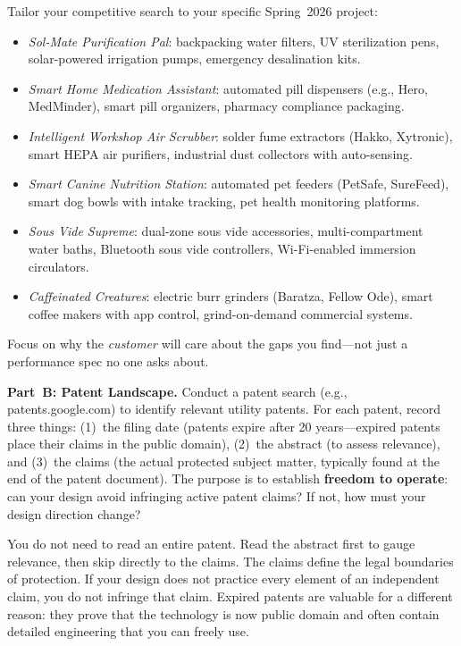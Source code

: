 \documentclass[11pt,letterpaper,twoside,openany]{book}
\begin{document}
\begin{tipbox}
Tailor your competitive search to your specific Spring~2026 project:
\begin{itemize}[nosep]
\item \textit{Sol-Mate Purification Pal}: backpacking water filters, UV sterilization pens, solar-powered irrigation pumps, emergency desalination kits.
\item \textit{Smart Home Medication Assistant}: automated pill dispensers (e.g., Hero, MedMinder), smart pill organizers, pharmacy compliance packaging.
\item \textit{Intelligent Workshop Air Scrubber}: solder fume extractors (Hakko, Xytronic), smart HEPA air purifiers, industrial dust collectors with auto-sensing.
\item \textit{Smart Canine Nutrition Station}: automated pet feeders (PetSafe, SureFeed), smart dog bowls with intake tracking, pet health monitoring platforms.
\item \textit{Sous Vide Supreme}: dual-zone sous vide accessories, multi-compartment water baths, Bluetooth sous vide controllers, Wi-Fi-enabled immersion circulators.
\item \textit{Caffeinated Creatures}: electric burr grinders (Baratza, Fellow Ode), smart coffee makers with app control, grind-on-demand commercial systems.
\end{itemize}
Focus on why the \emph{customer} will care about the gaps you find---not just a performance spec no one asks about.
\end{tipbox}

\textbf{Part~B: Patent Landscape.} Conduct a patent search (e.g., patents.google.com) to identify relevant utility patents. For each patent, record three things: (1)~the filing date (patents expire after 20 years---expired patents place their claims in the public domain), (2)~the abstract (to assess relevance), and (3)~the claims (the actual protected subject matter, typically found at the end of the patent document). The purpose is to establish \textbf{freedom to operate}: can your design avoid infringing active patent claims? If not, how must your design direction change?

\begin{tipbox}
You do not need to read an entire patent. Read the abstract first to gauge relevance, then skip directly to the claims. The claims define the legal boundaries of protection. If your design does not practice every element of an independent claim, you do not infringe that claim. Expired patents are valuable for a different reason: they prove that the technology is now public domain and often contain detailed engineering that you can freely use.
\end{tipbox}
\end{document}
